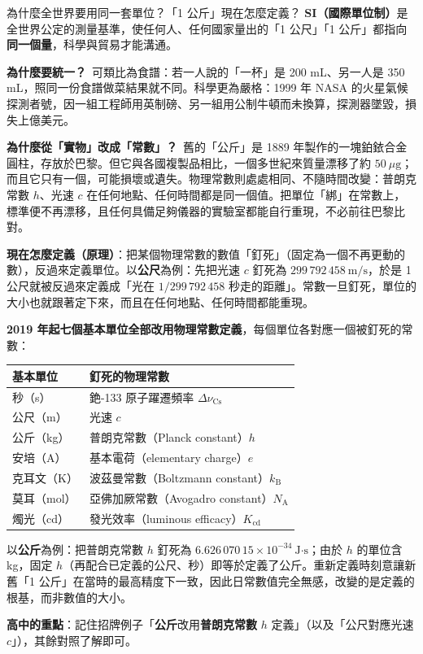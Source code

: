 \documentclass[11pt]{article}
\begin{document}
\begin{補充框}{為什麼全世界要用同一套單位？「1 公斤」現在怎麼定義？}
\textbf{SI（國際單位制）}是全世界公定的測量基準，使任何人、任何國家量出的「1 公尺」「1 公斤」都指向\textbf{同一個量}，科學與貿易才能溝通。

\textbf{為什麼要統一？}\ 可類比為食譜：若一人說的「一杯」是 200 mL、另一人是 350 mL，照同一份食譜做菜結果就不同。科學更為嚴格：1999 年 NASA 的火星氣候探測者號，因一組工程師用英制磅、另一組用公制牛頓而未換算，探測器墜毀，損失上億美元。

\textbf{為什麼從「實物」改成「常數」？}\ 舊的「公斤」是 1889 年製作的一塊鉑銥合金圓柱，存放於巴黎。但它與各國複製品相比，一個多世紀來質量漂移了約 $50\ \mu\text{g}$；而且它只有一個，可能損壞或遺失。物理常數則處處相同、不隨時間改變：普朗克常數 $h$、光速 $c$ 在任何地點、任何時間都是同一個值。把單位「綁」在常數上，標準便不再漂移，且任何具備足夠儀器的實驗室都能自行重現，不必前往巴黎比對。

\textbf{現在怎麼定義（原理）}：把某個物理常數的數值「釘死」（固定為一個不再更動的數），反過來定義單位。以\textbf{公尺}為例：先把光速 $c$ 釘死為 $299\,792\,458\ \text{m/s}$，於是 1 公尺就被反過來定義成「光在 $1/299\,792\,458$ 秒走的距離」。常數一旦釘死，單位的大小也就跟著定下來，而且在任何地點、任何時間都能重現。


\textbf{2019 年起七個基本單位全部改用物理常數定義}，每個單位各對應一個被釘死的常數：
\begin{center}
\renewcommand{\arraystretch}{1.3}
\begin{tabular}{l l}
\hline
\textbf{基本單位} & \textbf{釘死的物理常數} \\
\hline
秒（s） & 銫-133 原子躍遷頻率 $\Delta\nu_{\text{Cs}}$ \\
公尺（m） & 光速 $c$ \\
公斤（kg） & 普朗克常數（Planck constant）$h$ \\
安培（A） & 基本電荷（elementary charge）$e$ \\
克耳文（K） & 波茲曼常數（Boltzmann constant）$k_{\text{B}}$ \\
莫耳（mol） & 亞佛加厥常數（Avogadro constant）$N_{\text{A}}$ \\
燭光（cd） & 發光效率（luminous efficacy）$K_{\text{cd}}$ \\
\hline
\end{tabular}
\end{center}

以\textbf{公斤}為例：把普朗克常數 $h$ 釘死為 $6.626\,070\,15\times10^{-34}\ \text{J·s}$；由於 $h$ 的單位含 kg，固定 $h$（再配合已定義的公尺、秒）即等於定義了公斤。重新定義時刻意讓新舊「1 公斤」在當時的最高精度下一致，因此日常數值完全無感，改變的是定義的根基，而非數值的大小。

\textbf{高中的重點}：記住招牌例子「\textbf{公斤}改用\textbf{普朗克常數} $h$ 定義」（以及「公尺對應光速 $c$」），其餘對照了解即可。
\end{補充框}
\end{document}
